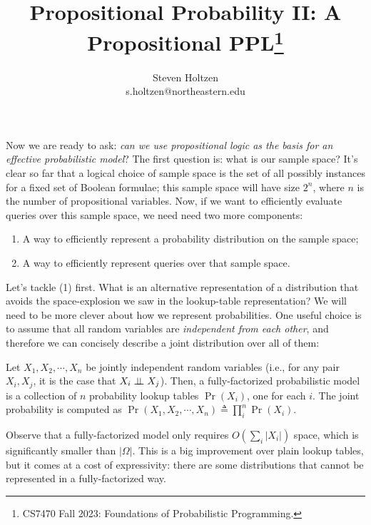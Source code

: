 \documentclass{tufte-handout}
\title{Propositional Probability II: A Propositional PPL\thanks{CS7470 Fall 2023: Foundations of Probabilistic Programming.}}
\author[]{Steven Holtzen\\s.holtzen@northeastern.edu}
\begin{document}
\maketitle%

Now we are ready to ask: \emph{can we use
propositional logic as the basis for an effective probabilistic model}?
The first question is: what is our sample space? It's clear so far that a logical 
choice of sample space is the set of all possibly instances for a fixed set 
of Boolean formulae; this sample space will have size $2^n$, where $n$ is the number 
of propositional variables.
Now, if we want to efficiently evaluate queries over this sample space, we need
need two more components:
\begin{enumerate}
    \item A way to efficiently represent a probability distribution on the sample space;
    \item A way to efficiently represent queries over that sample space.
\end{enumerate}


Let's tackle (1) first. What is an alternative representation of a distribution 
that avoids the space-explosion we saw in the lookup-table representation? We 
will need to be more clever about how we represent probabilities. One useful
choice is to assume that all random variables are \emph{independent from each other}, 
and therefore we can concisely describe a joint distribution over all of them:

\begin{definition}
    Let $X_1, X_2, \cdots, X_n$ be jointly independent random variables (i.e.,
    for any pair $X_i, X_j$, it is the case that $X_i \perp \!\!\! \perp X_j$). Then, a
    fully-factorized probabilistic model is a collection of $n$ probability
    lookup tables $\Pr(X_i)$, one for each $i$. The joint probability is computed 
    as $\Pr(X_1, X_2, \cdots, X_n) \triangleq \prod_i^n \Pr(X_i)$.
\end{definition}

Observe that a fully-factorized model only requires $O(\sum_i |X_i|)$ space,
which is significantly smaller than $|\Omega|$. This is a big improvement
over plain lookup tables, but it comes at a cost of expressivity: there are some
distributions that cannot be represented in a fully-factorized way.
\end{document}
